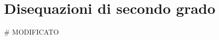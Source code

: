 


%
%   

%

\begin{comment}

\begin{inaccessibleblock}[]
\begin{center}
  \
\end{center}
\end{inaccessibleblock}
\end{comment}

\begin{comment}

\begin{minipage}{.45\textwidth}
\end{minipage}
\begin{minipage}{.25\textwidth}
\end{minipage}
\begin{minipage}{.3\textwidth}
\end{minipage}

\end{comment}

\chapter{Disequazioni di secondo grado} # MODIFICATO

